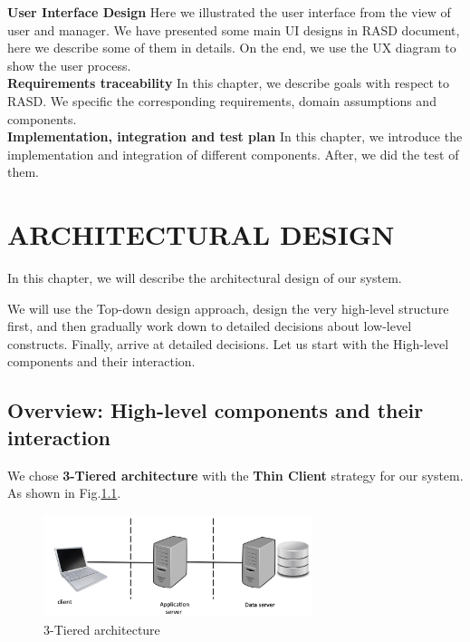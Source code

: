 \documentclass[a4paper,12pt]{report}
\begin{document}
\textbf{User Interface Design}
Here we illustrated the user interface from the view of user and manager. We have presented some main UI designs in RASD document, here we describe some of them in details. On the end, we use the UX diagram to show the user process.~\\

\textbf{Requirements traceability}
In this chapter, we describe goals with respect to RASD. We specific the corresponding requirements, domain assumptions and components.~\\

\textbf{Implementation, integration and test plan}
In this chapter, we introduce the implementation and integration of different components. After, we did the test of them.



\chapter{ARCHITECTURAL DESIGN}\label{ch:architectural-design}

In this chapter, we will describe the architectural design of our system.

We will use the Top-down design approach, design the very high-level structure first,
and then gradually work down to detailed decisions about low-level constructs.
Finally, arrive at detailed decisions.\cite{SlidesSE2}
Let us start with the High-level components and their interaction.


\section{Overview: High-level components and their interaction}\label{sec:ArchitectureOverview}

We chose \textbf{3-Tiered architecture} with the \textbf{Thin Client} strategy for our system.
As shown in Fig.\ref{fig:ThreeTieredArchitecture}.\cite{SistemiInformativi}

\begin{figure}[H]
	\centering
	\includegraphics[width=0.7\textwidth]{ThreeTiered}
	\caption{3-Tiered architecture}
	\centering
	\label{fig:ThreeTieredArchitecture}
\end{figure}
\end{document}
